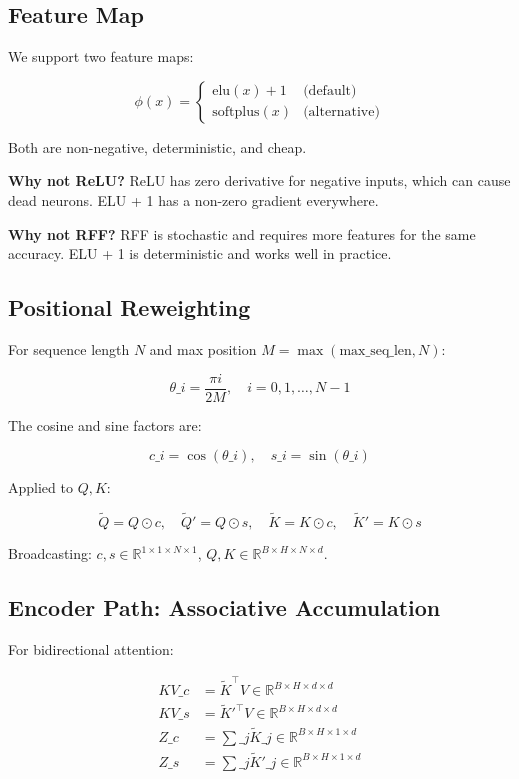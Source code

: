 \subsection{Feature Map}

We support two feature maps:

\[
\phi(x) = \begin{cases}
\text{elu}(x) + 1 & \text{(default)} \\
\text{softplus}(x) & \text{(alternative)}
\end{cases}
\]

Both are non-negative, deterministic, and cheap.

\textbf{Why not ReLU?} ReLU has zero derivative for negative inputs, which can 
cause dead neurons. ELU + 1 has a non-zero gradient everywhere.

\textbf{Why not RFF?} RFF is stochastic and requires more features for the same 
accuracy. ELU + 1 is deterministic and works well in practice.

\subsection{Positional Reweighting}

For sequence length $N$ and max position $M = \max(\text{max\_seq\_len}, N)$:

\[
\theta\_i = \frac{\pi i}{2 M}, \quad i = 0, 1, \dots, N-1
\]

The cosine and sine factors are:

\[
c\_i = \cos(\theta\_i), \quad s\_i = \sin(\theta\_i)
\]

Applied to $Q, K$:

\[
\tilde{Q} = Q \odot c, \quad \tilde{Q}' = Q \odot s, \quad
\tilde{K} = K \odot c, \quad \tilde{K}' = K \odot s
\]

Broadcasting: $c, s \in \mathbb{R}^{1 \times 1 \times N \times 1}$, 
$Q, K \in \mathbb{R}^{B \times H \times N \times d}$.

\subsection{Encoder Path: Associative Accumulation}

For bidirectional attention:

\[
\begin{aligned}
KV\_c &= \tilde{K}^\top V \in \mathbb{R}^{B \times H \times d \times d} \\
KV\_s &= \tilde{K}'^\top V \in \mathbb{R}^{B \times H \times d \times d} \\
Z\_c &= \sum\_j \tilde{K}\_j \in \mathbb{R}^{B \times H \times 1 \times d} \\
Z\_s &= \sum\_j \tilde{K}'\_j \in \mathbb{R}^{B \times H \times 1 \times d}
\end{aligned}
\]

